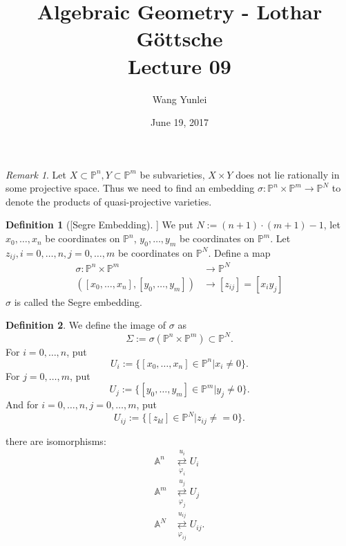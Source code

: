 \documentclass{amsart}
\theoremstyle{plain}
\theoremstyle{definition}
\newtheorem{definition}{Definition}
\theoremstyle{remark}
\newtheorem*{remark}{Remark}
\numberwithin{equation}{section}
\begin{document}
\title[Complete-simple distributive lattices]
{Algebraic Geometry - Lothar G\"{o}ttsche \\
	Lecture 09}
\author{Wang Yunlei}
\date{June 19, 2017}
 
\maketitle


\begin{remark}
	Let $ X\subset \mathbb{P}^n,Y\subset \mathbb{P}^m $ be subvarieties, $ X\times Y $ does not lie rationally in some projective space. Thus we need to find an embedding $ \sigma :\mathbb{P}^n\times \mathbb{P}^m \to \mathbb{P}^N$ to denote the products of quasi-projective varieties.
\end{remark}
\begin{definition}[[Segre Embedding]]
	We put $ N:=(n+1)\cdot (m+1)-1 $, let $ x_0,\dots,x_n $ be coordinates on $ \mathbb{P}^n $, $ y_0,\dots,y_m $ be coordinates on $ \mathbb{P}^m $. Let $ z_{ij}, i=0,\dots,n, j=0,\dots,m $ be coordinates on $ \mathbb{P}^N $. Define a map
	$$\begin{array}{cc}
	\sigma:\mathbb{P}^n\times \mathbb{P}^m & \to  \mathbb{P}^N\\
	([x_0,\dots,x_n],[y_0,\dots,y_m]) & \to  [z_{ij}]=[x_iy_j]
	\end{array}$$
	$ \sigma $ is called the Segre embedding.
\end{definition}
\begin{definition}
	We define the image of $ \sigma $ as
	$$
	\Sigma := \sigma(\mathbb{P}^n\times \mathbb{P}^m)\subset \mathbb{P}^N.
	$$
	For $ i=0,\dots,n $, put
	$$
	U_i:=\{ [x_0,\dots,x_n]\in \mathbb{P}^n|x_i\neq 0 \}.
	$$
	For $ j=0,\dots,m $, put
	$$
	U_j:=\{ [y_0,\dots,y_m]\in\mathbb{P}^m|y_j\neq 0 \}.
	$$
	And for $ i=0,\dots,n,j=0,\dots,m $, put
	$$
	U_{ij}:=\{ [z_{kl}]\in \mathbb{P}^{N}|z_{ij}\neq =0 \}.
	$$
\end{definition}
there are isomorphisms:
$$\begin{array}{cc}
\mathbb{A}^n & \mathop{\rightleftarrows}\limits_{\varphi_i}^{u_i}  U_i\\
\mathbb{A}^m & \mathop{\rightleftarrows}\limits_{\varphi_j}^{u_j} U_j\\
\mathbb{A}^N & \mathop{\rightleftarrows}\limits_{\varphi_{ij}}^{u_{ij}} U_{ij}.
\end{array}$$
\end{document}
